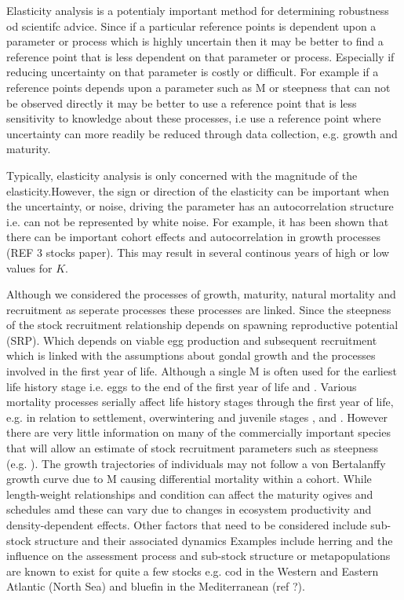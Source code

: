 \documentclass[10pt]{article}
\begin{document}
Elasticity analysis is a potentialy important method for determining robustness od scientifc advice. Since if a particular reference points is dependent upon a 
parameter or process which is highly uncertain then it may be better to find a reference point that is less dependent on that parameter or process. Especially if
reducing uncertainty on that parameter is costly or difficult. For example if a reference points depends upon a parameter such as M or steepness 
that can not be observed directly it may be better to use a reference point that is less sensitivity to knowledge about these processes, i.e use a reference point
where uncertainty can more readily be reduced through data collection, e.g. growth and maturity.

Typically, elasticity analysis is only concerned with the magnitude of the elasticity.However, the sign or direction of the elasticity can be important when the
uncertainty, or noise, driving the parameter has an autocorrelation structure i.e. can not be represented by white noise. For example, it has been shown that 
there can be important cohort effects and autocorrelation in growth processes (REF 3 stocks paper). This may result in several continous years of high or low values for
$K$. 

Although we considered the processes of growth, maturity, natural mortality and recruitment as seperate processes these processes are linked.
Since the steepness of the stock recruitment relationship depends on spawning reproductive potential (SRP). Which depends on viable egg production 
\cite{trippel1999estimation} and subsequent recruitment which is linked with the assumptions about gondal growth and the processes involved in the first year of life. 
Although a single M is often used for the earliest life history stage i.e. eggs to the end of the first year of life \cite{houde1989subtleties} and \cite{houde2002mortality}. 
Various mortality processes serially affect life history stages through the first year of life, e.g. in relation to settlement, overwintering and juvenile stages  \cite{Nash2012mearly}, 
\cite{mcgurk1986natural} and  \cite{pepin1991effect}. However there are very little information on many of the commercially important species that will allow an estimate of 
stock recruitment parameters such as steepness (e.g. \cite{mangel2010reproductive}). The growth trajectories of individuals may not follow a von Bertalanffy growth curve 
due to M causing differential mortality within a cohort. While  length-weight relationships and condition can affect the maturity ogives and schedules amd these can vary 
due to changes in ecosystem productivity and density-dependent effects. Other factors that need to be considered include sub-stock structure and their associated dynamics 
Examples include herring \cite{dickey2010lessons} and the influence on the assessment process \cite{kell2009lumpers} and sub-stock structure or metapopulations are known 
to exist for quite a few stocks e.g. cod in the Western \cite{frank2001contemporary} and Eastern Atlantic (North Sea) \cite{heath2008model} and bluefin in the Mediterranean (ref ?). 
\end{document}
